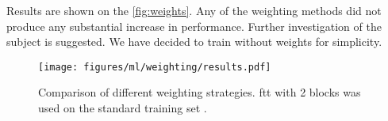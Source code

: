 Results are shown on the \autoref{fig:weights}. Any of the weighting methods did not produce any substantial increase in
performance. Further investigation of the subject is suggested. We have decided to train without weights for simplicity.

\begin{figure}[htb]
      \centering
      \texttt{[image: figures/ml/weighting/results.pdf]}
      \caption[Comparison of different weighting strategies.]
      {Comparison of different weighting strategies. \gls{ftt} with 2 blocks was used on the standard training set
            \ttrn.}
      \label{fig:weights}
\end{figure}
